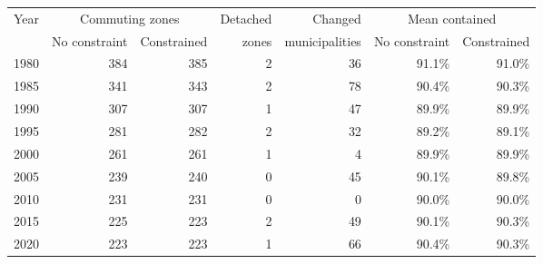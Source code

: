 \begin{tabular}{lrrrrrr}
\toprule
Year & \multicolumn{2}{c}{Commuting zones} & Detached & Changed & \multicolumn{2}{c}{Mean contained} \\\cmidrule(lr){2-3} \cmidrule(lr){6-7} & No constraint & Constrained & zones & municipalities & No constraint & Constrained \\
\midrule
1980 & 384 & 385 & 2 & 36 & 91.1\% & 91.0\% \\
1985 & 341 & 343 & 2 & 78 & 90.4\% & 90.3\% \\
1990 & 307 & 307 & 1 & 47 & 89.9\% & 89.9\% \\
1995 & 281 & 282 & 2 & 32 & 89.2\% & 89.1\% \\
2000 & 261 & 261 & 1 & 4 & 89.9\% & 89.9\% \\
2005 & 239 & 240 & 0 & 45 & 90.1\% & 89.8\% \\
2010 & 231 & 231 & 0 & 0 & 90.0\% & 90.0\% \\
2015 & 225 & 223 & 2 & 49 & 90.1\% & 90.3\% \\
2020 & 223 & 223 & 1 & 66 & 90.4\% & 90.3\% \\
\bottomrule
\end{tabular}
